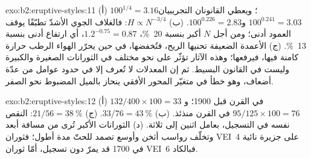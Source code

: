\begin{solution}{exo:b2:eruptive-styles:11}
(أ) $100^{1/4} = 3.16$؛ ويعطي القانونان التجريبيان $100^{0.241} = 3.03$
و$100^{0.226} = 2.83$. (ب) $H \propto N^{-3/4}$: فالغلاف الجوي الأشدّ تطبّقًا
يوقف العمود أدنى؛ ومن أجل $N$ أكبر بنسبة \qty{20}{\percent}،
$1.2^{-0.75} = 0.87$، أي ارتفاع أدنى بنسبة \qty{13}{\percent}. (ج) الأعمدة الضعيفة
تحنيها الريح، فتُخفضها، في حين يحرّر الهواء الرطب حرارة كامنة
فيها، فيرفعها؛ وهذه الآثار تؤثّر على نحو مختلف في الثورانات الصغيرة والكبيرة
وليست في القانون البسيط. ثم إن المعدلات لا تُعرف إلا في حدود
عوامل من عدّة أضعاف، وهو خطأ في متغيّر المحور الأفقي ينحاز
بالميل المضبوط نحو الصفر.
\end{solution}

\begin{solution}{exo:b2:eruptive-styles:12}
(أ) $132/400\times100 = 33$ في القرن قبل 1900؛ و$95/125\times100 = 76$ في
القرن منذئذ. (ب) $33/76 = \qty{43}{\percent}$. (ج) $21/56 = \qty{38}{\percent}$:
النقص نفسه في التسجيل، بعامل اثنين إلى ثلاثة. (د) الثورانات الأكبر
تُرى من مسافة أبعد وتخلّف رواسب أثخن وأوسع تصمد للحتّ
مدة أطول؛ فثوران VEI~4 على جزيرة نائية في 1700 قد يمرّ دون تسجيل، أمّا
ثوران VEI~6 فبالكاد.
\end{solution}

